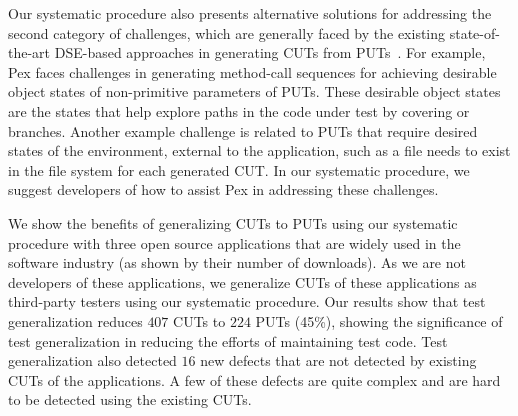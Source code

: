 Our systematic procedure also presents alternative solutions for addressing the second category of challenges, which are generally faced by the existing state-of-the-art DSE-based approaches in generating CUTs from PUTs~\cite{thummalapenta09:mseqgen}. For example, Pex faces challenges in generating method-call sequences for achieving desirable object states of non-primitive parameters of PUTs. These desirable object states are the states that help explore paths in the code under test by covering  or  branches. Another example challenge is related to PUTs that require desired states of the environment, external to the application, such as a file needs to exist in the file system for each generated CUT. In our systematic procedure, we suggest developers of how to assist Pex in addressing these challenges.

We show the benefits of generalizing CUTs to PUTs using our systematic procedure with three open source applications that are widely used in the software industry (as shown by their number of downloads). As we are not developers of these applications, we generalize CUTs of these applications as third-party testers using our systematic procedure. Our results show that test generalization reduces $407$ CUTs to $224$ PUTs (45\%), showing the significance of test generalization in reducing the efforts of maintaining test code. Test generalization also detected $16$ new defects that are not detected by existing CUTs of the applications. A few of these defects are quite complex and are hard to be detected using the existing CUTs. 


